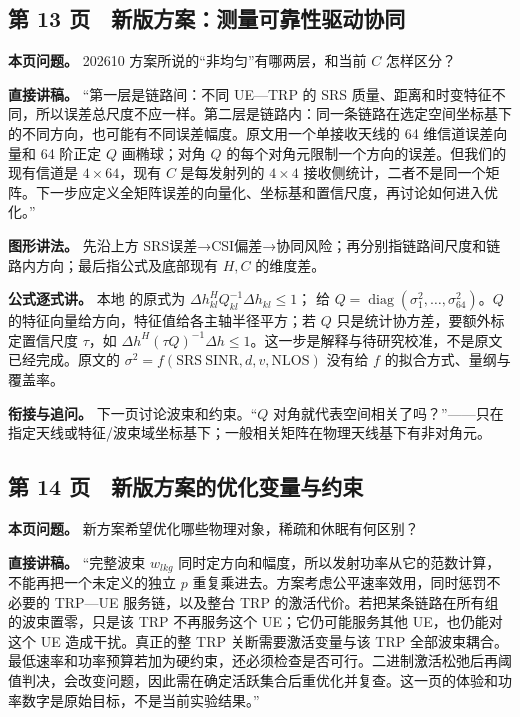 \documentclass[11pt,a4paper]{ctexart}
\begin{document}
\subsection*{第 13 页　新版方案：测量可靠性驱动协同}

\textbf{本页问题。} 202610 方案所说的“非均匀”有哪两层，和当前 $C$ 怎样区分？\par

\textbf{直接讲稿。} “第一层是链路间：不同 UE—TRP 的 SRS 质量、距离和时变特征不同，所以误差总尺度不应一样。第二层是链路内：同一条链路在选定空间坐标基下的不同方向，也可能有不同误差幅度。原文用一个单接收天线的 64 维信道误差向量和 64 阶正定 $Q$ 画椭球；对角 $Q$ 的每个对角元限制一个方向的误差。但我们的现有信道是 $4\times64$，现有 $C$ 是每发射列的 $4\times4$ 接收侧统计，二者不是同一个矩阵。下一步应定义全矩阵误差的向量化、坐标基和置信尺度，再讨论如何进入优化。”\par

\textbf{图形讲法。} 先沿上方 SRS误差→CSI偏差→协同风险；再分别指链路间尺度和链路内方向；最后指公式及底部现有 $H,C$ 的维度差。\par

\textbf{公式逐式讲。} 本地  的原式为 $\Delta h_{kl}^H Q_{kl}^{-1}\Delta h_{kl}\le1$； 给 $Q=\operatorname{diag}(\sigma_1^2,\ldots,\sigma_{64}^2)$。$Q$ 的特征向量给方向，特征值给各主轴半径平方；若 $Q$ 只是统计协方差，要额外标定置信尺度 $\tau$，如 $\Delta h^H(\tau Q)^{-1}\Delta h\le1$。这一步是解释与待研究校准，不是原文已经完成。原文的 $\sigma^2=f(\mathrm{SRS\ SINR},d,v,\mathrm{NLOS})$ 没有给 $f$ 的拟合方式、量纲与覆盖率。\par

\textbf{衔接与追问。} 下一页讨论波束和约束。“$Q$ 对角就代表空间相关了吗？”——只在指定天线或特征/波束域坐标基下；一般相关矩阵在物理天线基下有非对角元。\par

\subsection*{第 14 页　新版方案的优化变量与约束}

\textbf{本页问题。} 新方案希望优化哪些物理对象，稀疏和休眠有何区别？\par

\textbf{直接讲稿。} “完整波束 $w_{lkg}$ 同时定方向和幅度，所以发射功率从它的范数计算，不能再把一个未定义的独立 $p$ 重复乘进去。方案考虑公平速率效用，同时惩罚不必要的 TRP—UE 服务链，以及整台 TRP 的激活代价。若把某条链路在所有组的波束置零，只是该 TRP 不再服务这个 UE；它仍可能服务其他 UE，也仍能对这个 UE 造成干扰。真正的整 TRP 关断需要激活变量与该 TRP 全部波束耦合。最低速率和功率预算若加为硬约束，还必须检查是否可行。二进制激活松弛后再阈值判决，会改变问题，因此需在确定活跃集合后重优化并复查。这一页的体验和功率数字是原始目标，不是当前实验结果。”\par
\end{document}
